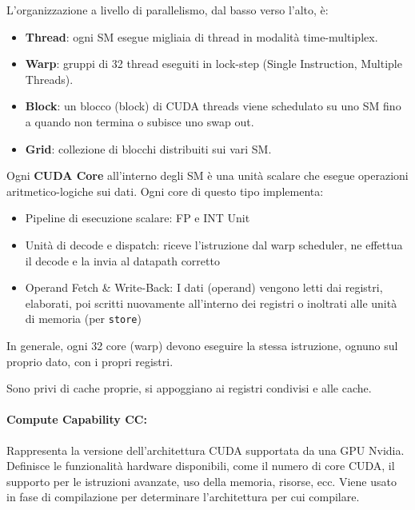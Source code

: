 L'organizzazione a livello di parallelismo, dal basso verso l'alto, è:
\begin{itemize}
	\item \textbf{Thread}: ogni SM esegue migliaia di thread in modalità time-multiplex.
	
	\item \textbf{Warp}: gruppi di 32 thread eseguiti in lock-step (Single Instruction, Multiple Threads).
	
	\item \textbf{Block}: un blocco (block) di CUDA threads viene schedulato su uno SM fino a quando non termina o subisce uno swap out.
	
	\item \textbf{Grid}: collezione di blocchi distribuiti sui vari SM.
\end{itemize}

Ogni \textbf{CUDA Core} all'interno degli SM è una unità scalare che esegue operazioni aritmetico-logiche sui dati. Ogni core di questo tipo implementa:
\begin{itemize}
	\item Pipeline di esecuzione scalare: FP e INT Unit
	
	\item Unità di decode e dispatch: riceve l'istruzione dal warp scheduler, ne effettua il decode e la invia al datapath corretto
	
	\item Operand Fetch \& Write-Back: I dati (operand) vengono letti dai registri, elaborati, poi scritti nuovamente all'interno dei registri o inoltrati alle unità di memoria (per \texttt{store})
\end{itemize}

In generale, ogni 32 core (warp) devono eseguire la stessa istruzione, ognuno sul proprio dato, con i propri registri. 

Sono privi di cache proprie, si appoggiano ai registri condivisi e alle cache.

\paragraph{Compute Capability CC:} Rappresenta la versione dell'architettura CUDA supportata da una GPU Nvidia. Definisce le funzionalità hardware disponibili, come il numero di core CUDA, il supporto per le istruzioni avanzate, uso della memoria, risorse, ecc. Viene usato in fase di compilazione per determinare l'architettura per cui compilare.

